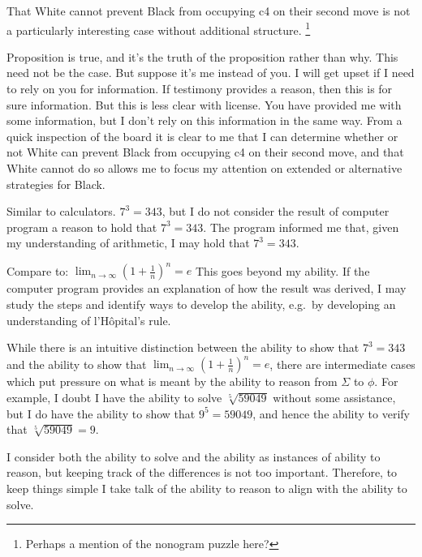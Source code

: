 \documentclass[10pt]{article}
\begin{document}
That White cannot prevent Black from occupying c4 on their second move is not a particularly interesting case without additional structure.\nolinebreak
\footnote{
  Perhaps a mention of the nonogram puzzle here?
}

Proposition is true, and it's the truth of the proposition rather than why.
This need not be the case.
But suppose it's me instead of you.
I will get upset if I need to rely on you for information.
If testimony provides a reason, then this is for sure information.
But this is less clear with license.
You have provided me with some information, but I don't rely on this information in the same way.
From a quick inspection of the board it is clear to me that I can determine whether or not White can prevent Black from occupying c4 on their second move, and that White cannot do so allows me to focus my attention on extended or alternative strategies for Black.

Similar to calculators.
\(7^{3} = 343\), but I do not consider the result of computer program a reason to hold that \(7^{3} = 343\).
The program informed me that, given my understanding of arithmetic, I may hold that \(7^{3} = 343\).

Compare to:
\(\lim_{n \to \infty}\left(1 + \frac{1}{n} \right)^{n} = e\)
This goes beyond my ability.
If the computer program provides an explanation of how the result was derived, I may study the steps and identify ways to develop the ability, e.g.\ by developing an understanding of l'H\^{o}pital's rule.

While there is an intuitive distinction between the ability to show that \(7^{3} = 343\) and the ability to show that \(\lim_{n \to \infty}\left(1 + \frac{1}{n} \right)^{n} = e\), there are intermediate cases which put pressure on what is meant by the ability to reason from \(\Sigma\) to \(\phi\).
For example, I doubt I have the ability to solve \(\sqrt[5]{59049}\) without some assistance, but I do have the ability to show that \(9^{5} = 59049\), and hence the ability to verify that \(\sqrt[5]{59049} = 9\).

I consider both the ability to solve and the ability as instances of ability to reason, but keeping track of the differences is not too important.
Therefore, to keep things simple I take talk of the ability to reason to align with the ability to solve.

\end{document}

